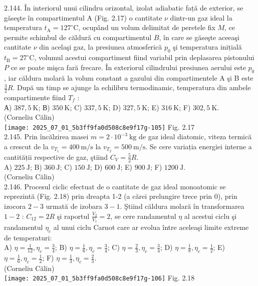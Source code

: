 2.144. În interiorul unui cilindru orizontal, izolat adiabatic față de exterior, se găseşte în compartimentul A (Fig. 2.17) o cantitate $\nu$ dintr-un gaz ideal la temperatura $t_{\mathrm{A}}=127^{\circ} \mathrm{C}$, ocupând un volum delimitat de peretele fix $M$, ce permite schimbul de căldură cu compartimentul $B$, în care se găseşte aceeaşi cantitate $\nu$ din acelaşi gaz, la presiunea atmosferică $p_{0}$ şi temperatura inițială $t_{\mathrm{B}}=27^{\circ} \mathrm{C}$, volumul acestui compartiment fiind variabil prin deplasarea pistonului $P$ ce se poate mişca fară frecare. În exteriorul cilindrului presiunea aerului este $p_{0}$, iar căldura molară la volum constant a gazului din compartimentele A şi B este $\frac{3}{2} R$. După un timp se ajunge la echilibru termodinamic, temperatura din ambele compartimente fiind $T_{f}$ :\\ А) $387,5 \mathrm{~K}$; В) $350 \mathrm{~K}$; C) $337,5 \mathrm{~K}$; D) $327,5 \mathrm{~K}$; E) $316 \mathrm{~K}$; F) $302,5 \mathrm{~K}$.\\ (Corneliu Călin)\\ \texttt{[image: 2025\_07\_01\_5b3ff9fa0d508c8e9f17g-105]} Fig. 2.17\\

2.145. Prin încălzirea masei $m=2 \cdot 10^{-3} \mathrm{~kg}$ de gaz ideal diatomic, viteza termică a crescut de la $v_{T_{1}}=400 \mathrm{~m} / \mathrm{s}$ la $v_{T_{2}}=500 \mathrm{~m} / \mathrm{s}$. Se cere variația energiei interne a cantității respective de gaz, ştiind $C_{V}=\frac{5}{2} R$.\\ A) $225 \mathrm{~J}$; B) $360 \mathrm{~J}$; C) $150 \mathrm{~J}$; D) $600 \mathrm{~J}$; E) $900 \mathrm{~J}$; F) $1200 \mathrm{~J}$.\\ (Corneliu Călin)\\

2.146. Procesul ciclic efectuat de o cantitate de gaz ideal monoatomic se reprezintă (Fig. 2.18) prin dreapta 1-2 (a cărei prelungire trece prin 0), prin izocora $2-3$ urmată de izobara $3-1$. Ştiind căldura molară în transformarea $1-2$ : $C_{12}=2 R$ şi raportul $\frac{V_{2}}{V_{1}}=2$, se cere randamentul $\eta$ al acestui ciclu şi randamentul $\eta_{c}$ al unui ciclu Carnot care ar evolua între aceleaşi limite extreme de temperaturi:\\ A) $\eta=\frac{1}{12}, \eta_{c}=\frac{3}{4}$; B) $\eta=\frac{1}{6}, \eta_{c}=\frac{3}{4}$; C) $\eta=\frac{2}{3}, \eta_{c}=\frac{3}{4}$; D) $\eta=\frac{1}{8}, \eta_{c}=\frac{1}{2}$; E) $\eta=\frac{1}{6}, \eta_{c}=\frac{1}{2}$; F) $\eta=\frac{1}{3}, \eta_{c}=\frac{2}{3}$.\\ (Corneliu Călin)\\ \texttt{[image: 2025\_07\_01\_5b3ff9fa0d508c8e9f17g-106]} Fig. 2.18\\

